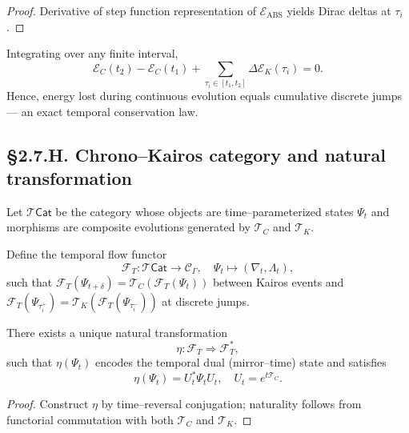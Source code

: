\begin{proof}
Derivative of step function representation of $\mathcal{E}_{\mathrm{ABS}}$ yields Dirac deltas at $\tau_i$.
\end{proof}

\begin{corollary}
Integrating over any finite interval,
\[
\mathcal{E}_C(t_2)-\mathcal{E}_C(t_1)
+\sum_{\tau_i\in[t_1,t_2]}\Delta\mathcal{E}_K(\tau_i)=0.
\]
\]
Hence, energy lost during continuous evolution equals cumulative discrete jumps — an exact temporal conservation law.
\end{corollary}

\subsection*{§2.7.H. Chrono–Kairos category and natural transformation}

\begin{definition}
Let $\mathcal{T}\!\mathsf{Cat}$ be the category whose objects are time–parameterized states $\Psi_t$ and morphisms are composite evolutions generated by $\mathcal{T}_C$ and $\mathcal{T}_K$.
\]
\end{definition}

\begin{lemma}
Define the temporal flow functor
\[
\mathcal{F}_T:\mathcal{T}\!\mathsf{Cat}\to\mathcal{C}_\Gamma,
\quad
\Psi_t\mapsto(\nabla_t,\Lambda_t),
\]
such that $\mathcal{F}_T(\Psi_{t+\delta})=\mathcal{T}_C(\mathcal{F}_T(\Psi_t))$ between Kairos events and $\mathcal{F}_T(\Psi_{\tau_i^+})=\mathcal{T}_K(\mathcal{F}_T(\Psi_{\tau_i^-}))$ at discrete jumps.
\]
\end{lemma}

\begin{theorem}\label{thm:2.7.natural}
There exists a unique natural transformation
\[
\eta:\mathcal{F}_T\Rightarrow \mathcal{F}_T^\ast,
\]
such that $\eta(\Psi_t)$ encodes the temporal dual (mirror–time) state and satisfies
\[
\eta(\Psi_t) = U_t^\ast \Psi_t U_t,
\quad U_t=e^{t\mathcal{T}_C}.
\]
\end{theorem}

\begin{proof}
Construct $\eta$ by time–reversal conjugation; naturality follows from functorial commutation with both $\mathcal{T}_C$ and $\mathcal{T}_K$.
\end{proof}


